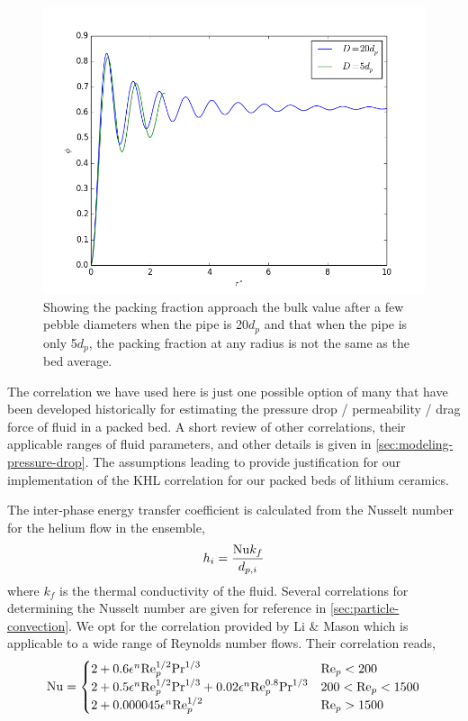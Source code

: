 \begin{figure}[htbp]
\centering
	\includegraphics[width = \singleimagewidth]{figures/annular-packing-fraction.png}
	\caption{Showing the packing fraction approach the bulk value after a few pebble diameters when the pipe is 20$d_p$ and that when the pipe is only 5$d_p$, the packing fraction at any radius is not the same as the bed average.}
	\label{fig:packingDist}
\end{figure}

The correlation we have used here is just one possible option of many that have been developed historically for estimating the pressure drop / permeability / drag force of fluid in a packed bed. A short review of other correlations, their applicable ranges of fluid parameters, and other details is given in \cref{sec:modeling-pressure-drop}. The assumptions leading to  provide justification for our implementation of the KHL correlation for our packed beds of lithium ceramics.
\FloatBarrier



The inter-phase energy transfer coefficient is calculated from the Nusselt number for the helium flow in the ensemble,
\begin{equation}\label{eq:interphase-energy}
	h_i = \frac{\mathrm{Nu} k_f}{d_{p,i}}
\end{equation}
where $k_f$ is the thermal conductivity of the fluid. Several correlations for determining the Nusselt number are given for reference in \cref{sec:particle-convection}. We opt for the correlation provided by Li \& Mason which is applicable to a wide range of Reynolds number flows.\cite{Li2000} Their correlation reads,
\begin{equation}\label{eq:li-mason-correlation}
	\mathrm{Nu} = \begin{cases}
	2+ 0.6\epsilon^n\mathrm{Re}_p^{1/2}\mathrm{Pr}^{1/3} 										& \mathrm{Re}_p < 200\\
	2+ 0.5\epsilon^n\mathrm{Re}_p^{1/2}\mathrm{Pr}^{1/3} + 0.02 \epsilon^n \mathrm{Re}_p^{0.8}\mathrm{Pr}^{1/3} & 200 < \mathrm{Re}_p < 1500\\
	2+ 0.000045\epsilon^n\mathrm{Re}_p^{1/2}			 								& \mathrm{Re}_p > 1500
	\end{cases}
\end{equation}


